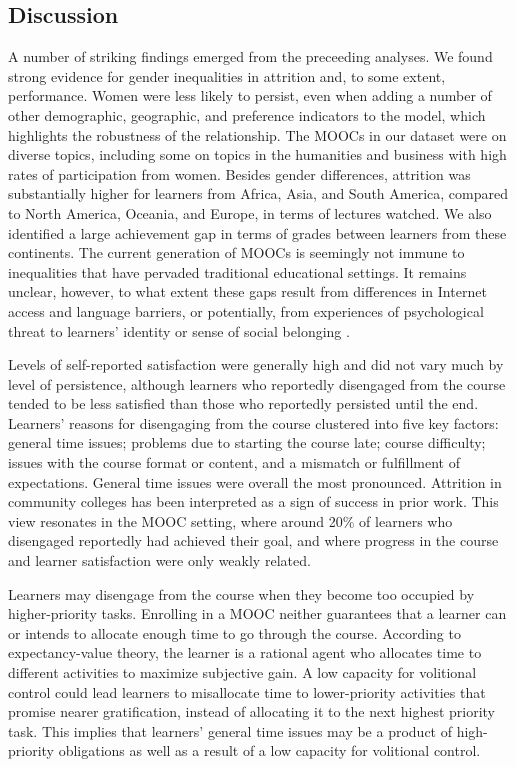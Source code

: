 \documentclass{sigchi}\usepackage[]{graphicx}\usepackage[]{color}
\begin{document}
\subsection{Discussion}
A number of striking findings emerged from the preceeding analyses. We found strong evidence for gender inequalities in attrition and, to some extent, performance. Women were less likely to persist, even when adding a number of other demographic, geographic, and preference indicators to the model, which highlights the robustness of the relationship. The MOOCs in our dataset were on diverse topics, including some on topics in the humanities and business with high rates of participation from women. Besides gender differences, attrition was substantially higher for learners from Africa, Asia, and South America, compared to North America, Oceania, and Europe, in terms of lectures watched. We also identified a large achievement gap in terms of grades between learners from these continents. The current generation of MOOCs is seemingly not immune to inequalities that have pervaded traditional educational settings. It remains unclear, however, to what extent these gaps result from differences in Internet access and language barriers, or potentially, from experiences of psychological threat to learners' identity or sense of social belonging \cite{walton2007question}.

Levels of self-reported satisfaction were generally high and did not vary much by level of persistence, although learners who reportedly disengaged from the course tended to be less satisfied than those who reportedly persisted until the end. Learners' reasons for disengaging from the course clustered into five key factors: general time issues; problems due to starting the course late; course difficulty; issues with the course format or content, and a mismatch or fulfillment of expectations. General time issues were overall the most pronounced. Attrition in community colleges has been interpreted as a sign of success in prior work. This view resonates in the MOOC setting, where around 20\% of learners who disengaged reportedly had achieved their goal, and where progress in the course and learner satisfaction were only weakly related.

Learners may disengage from the course when they become too occupied by higher-priority tasks. Enrolling in a MOOC neither guarantees that a learner can or intends to allocate enough time to go through the course. According to expectancy-value theory, the learner is a rational agent who allocates time to different activities to maximize subjective gain. A low capacity for volitional control \cite{corno2001volitional} could lead learners to misallocate time to lower-priority activities that promise nearer gratification, instead of allocating it to the next highest priority task. This implies that learners' general time issues may be a product of high-priority obligations as well as a result of a low capacity for volitional control.
\end{document}
